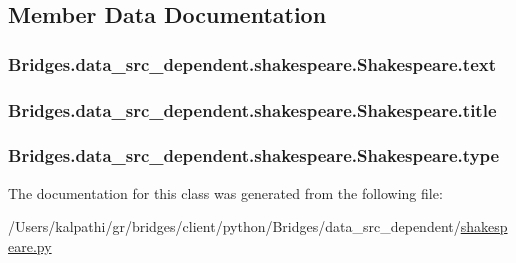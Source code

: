 \subsection{Member Data Documentation}
\hypertarget{class_bridges_1_1data__src__dependent_1_1shakespeare_1_1_shakespeare_ad24a2f07ad2841d91796c9fb886a328c}{}
\subsubsection[{text}]{\setlength{\rightskip}{0pt plus 5cm}Bridges.\+data\+\_\+src\+\_\+dependent.\+shakespeare.\+Shakespeare.\+text}\label{class_bridges_1_1data__src__dependent_1_1shakespeare_1_1_shakespeare_ad24a2f07ad2841d91796c9fb886a328c}
\hypertarget{class_bridges_1_1data__src__dependent_1_1shakespeare_1_1_shakespeare_a72a89a4c8f50b874bc10c34957045402}{}
\subsubsection[{title}]{\setlength{\rightskip}{0pt plus 5cm}Bridges.\+data\+\_\+src\+\_\+dependent.\+shakespeare.\+Shakespeare.\+title}\label{class_bridges_1_1data__src__dependent_1_1shakespeare_1_1_shakespeare_a72a89a4c8f50b874bc10c34957045402}
\hypertarget{class_bridges_1_1data__src__dependent_1_1shakespeare_1_1_shakespeare_ab0f52b854da1eadbe76a160cc0af2eec}{}
\subsubsection[{type}]{\setlength{\rightskip}{0pt plus 5cm}Bridges.\+data\+\_\+src\+\_\+dependent.\+shakespeare.\+Shakespeare.\+type}\label{class_bridges_1_1data__src__dependent_1_1shakespeare_1_1_shakespeare_ab0f52b854da1eadbe76a160cc0af2eec}


The documentation for this class was generated from the following file\+:\begin{DoxyCompactItemize}
\item 
/\+Users/kalpathi/gr/bridges/client/python/\+Bridges/data\+\_\+src\+\_\+dependent/\hyperlink{shakespeare_8py}{shakespeare.\+py}\end{DoxyCompactItemize}
